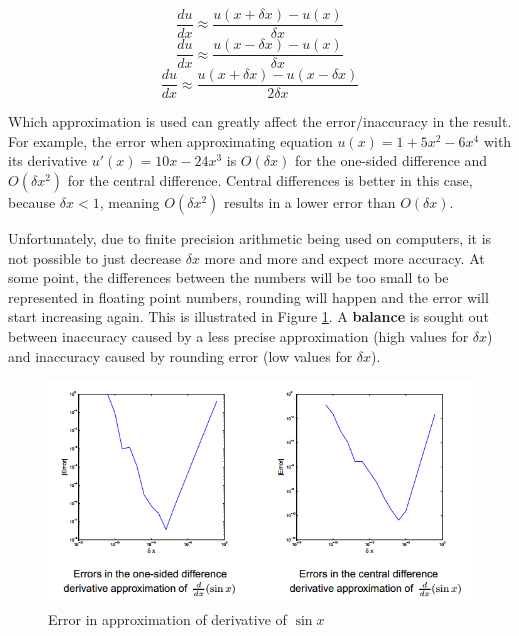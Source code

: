 \documentclass{article}
\begin{document}
\begin{equation}
	\frac{du}{dx} \approx \frac{u(x + \delta x) - u(x)}{\delta x}
	\label{eq:derivative1-approx}
\end{equation}
\begin{equation}
	\frac{du}{dx} \approx \frac{u(x - \delta x) - u(x)}{\delta x}
	\label{eq:derivative2-approx}
\end{equation}
\begin{equation}
	\frac{du}{dx} \approx \frac{u(x + \delta x) - u(x - \delta x)}{2\delta x}
	\label{eq:derivative3-approx}
\end{equation}

Which approximation is used can greatly affect the error/inaccuracy in the result. For example, the error when approximating equation $u(x) = 1 + 5x^2 - 6x^4$ with its derivative $u'(x) = 10x - 24x^3$ is $O(\delta x)$ for the one-sided difference and $O(\delta x^2)$ for the central difference. Central differences is better in this case, because $\delta x < 1$, meaning $O(\delta x^2)$ results in a lower error than $O(\delta x)$.

Unfortunately, due to finite precision arithmetic being used on computers, it is not possible to just decrease $\delta x$ more and more and expect more accuracy. At some point, the differences between the numbers will be too small to be represented in floating point numbers, rounding will happen and the error will start increasing again. This is illustrated in Figure \ref{fig:derivative-approx-error}. A \textbf{balance} is sought out between inaccuracy caused by a less precise approximation (high values for $\delta x$) and inaccuracy caused by rounding error (low values for $\delta x$).

\begin{figure}
	\centering

	\includegraphics[scale=0.5]{figures/derivative-approx-error}
	\caption{Error in approximation of derivative of $\sin x$}
	\label{fig:derivative-approx-error}
\end{figure}
\end{document}

